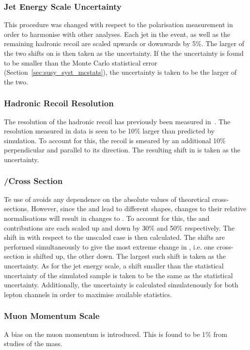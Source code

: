 \subsubsection{Jet Energy Scale Uncertainty}
\label{sec:susy_jes_uncertainty}
This procedure was changed with respect to the \PW polarisation measurement in
order to harmonise with other analyses. Each jet in the event, as well as the
remaining hadronic recoil are scaled upwards or downwards by 5\%. The larger of
the two shifts on \RCS is then taken as the uncertainty. If the the uncertainty
is found to be smaller than the Monte Carlo statistical error
(Section~\ref{sec:susy_syst_mcstats}), the uncertainty is taken to be the larger
of the two.

\subsubsection{Hadronic Recoil Resolution}
\label{sec:susy_metres_uncertainty}
The resolution of the hadronic recoil has previously been measured
in~\cite{cms_met_pas}. The resolution measured in data is seen to be 10\% larger
than predicted by simulation. To account for this, the recoil is smeared by an
additional 10\% perpendicular and parallel to its direction. The resulting shift
in \RCS is taken as the uncertainty.

\subsubsection{\Wjets/\ttbar Cross Section}
Te use of \RCS avoids any dependence on the absolute values of theoretical
cross-sections. However, since the \Wjets and \ttbar lead to different \LP
shapes, changes to their relative normalisations will result in changes to
\RCS. To account for this, the \Wjets and \ttbar contributions are each scaled
up and down by 30\% and 50\% respectively. The shift in \RCS with respect to the
unscaled case is then calculated. The shifts are performed simultaneously to
give the most extreme change in \RCS, i.e. one cross-section is shifted up, the
other down. The largest such shift is taken as the uncertainty. As for the jet
energy scale, a shift smaller than the statistical uncertainty of the simulated
sample is taken to be the same as the statistical uncertainty. Additionally, the
uncertainty is calculated simulatenously for both lepton channels in order to
maximise available statistics.

\subsubsection{Muon Momentum Scale}
A bias on the muon momentum is introduced. This is found to be 1\% from studies
of the \PZ mass.

